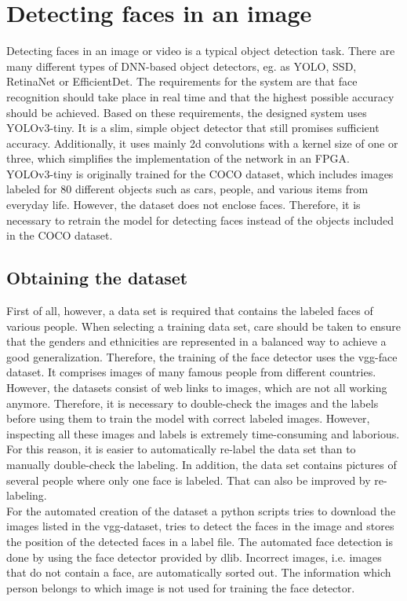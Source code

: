 \documentclass[%
a4paper,
twoside,
openany,
dvipsnames
]
{report}
\begin{document}
	\section{Detecting faces in an image}
	Detecting faces in an image or video is a typical object detection task. There are many different types of DNN-based object detectors, eg. as YOLO, SSD, RetinaNet or EfficientDet. The requirements for the system are that face recognition should take place in real time and that the highest possible accuracy should be achieved. Based on these requirements, the designed system uses YOLOv3-tiny. It is a slim, simple object detector that still promises sufficient accuracy. Additionally, it uses mainly 2d convolutions with a kernel size of one or three, which simplifies the implementation of the network in an \gls{FPGA}. \\
	YOLOv3-tiny is originally trained for the COCO dataset, which includes images labeled for 80 different objects such as cars, people, and various items from everyday life. However, the dataset does not enclose faces. Therefore, it is necessary to retrain the model for detecting faces instead of the objects included in the COCO dataset. 
	\subsection{Obtaining the dataset}
	First of all, however, a data set is required that contains the labeled faces of various people. When selecting a training data set, care should be taken to ensure that the genders and ethnicities are represented in a balanced way to achieve a good generalization. Therefore, the training of the face detector uses the vgg-face dataset. It comprises images of many famous people from different countries. However, the datasets consist of web links to images, which are not all working anymore. Therefore, it is necessary to double-check the images and the labels before using them to train the model with correct labeled images. However, inspecting all these images and labels is extremely time-consuming and laborious. For this reason, it is easier to automatically re-label the data set than to manually double-check the labeling. In addition, the data set contains pictures of several people where only one face is labeled. That can also be improved by re-labeling. \\
	For the automated creation of the dataset a python scripts tries to download the images listed in the vgg-dataset, tries to detect the faces in the image and stores the position of the detected faces in a label file. The automated face detection is done by using the face detector provided by dlib. Incorrect images, i.e. images that do not contain a face, are automatically sorted out. The information which person belongs to which image is not used for training the face detector. \\
\end{document}

